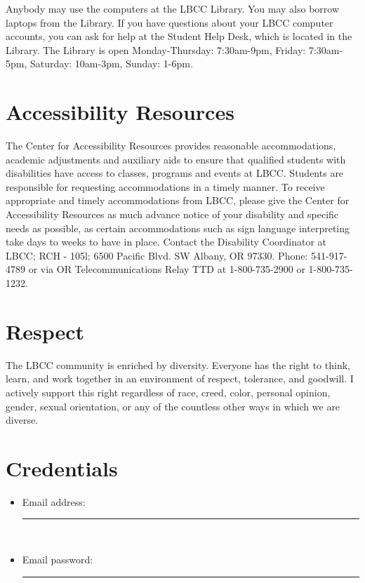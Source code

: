 \documentclass[12pt,article,oneside]{memoir}
\begin{document}
Anybody may use the computers at the LBCC Library. You may also borrow laptops from the Library.  If you have questions about your LBCC computer accounts, you can ask for help at the Student Help Desk, which is located in the Library.  The Library is open Monday-Thursday: 7:30am-9pm, Friday: 7:30am-5pm, Saturday: 10am-3pm, Sunday: 1-6pm.

\section{Accessibility Resources}

The Center for Accessibility Resources provides reasonable accommodations, academic adjustments and auxiliary aids to ensure that qualified students with disabilities have access to classes, programs and events at LBCC. Students are responsible for requesting accommodations in a timely manner. To receive appropriate and timely accommodations from LBCC, please give the Center for Accessibility Resources as much advance notice of your disability and specific needs as possible, as certain accommodations such as  sign language interpreting take days to weeks to have in place. Contact the Disability Coordinator at LBCC; RCH - 105l; 6500 Pacific Blvd. SW Albany, OR 97330. Phone: 541-917-4789 or via OR Telecommunications Relay TTD at 1-800-735-2900 or 1-800-735-1232.

\section{Respect}

The LBCC community is enriched by diversity. Everyone has the right to think, learn, and work together in an environment of respect, tolerance, and goodwill. I actively support this right regardless of race, creed, color, personal opinion, gender, sexual orientation, or any of the countless other ways in which we are diverse.  


\section{Credentials}
\begin{itemize}
\item Email address: \rule{4in}{.1pt} \\
\vspace{1in}
\item Email password: \rule{4in}{.1pt} \\
\end{itemize}
\end{document}

